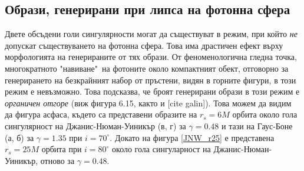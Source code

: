 \subsection{Образи, генерирани при липса на фотонна сфера}

Двете обсъдени голи сингулярности могат да съществуват в режим, при който \emph{не} допускат съществуването на фотонна сфера. Това има драстичен ефект върху морфологията на генерираните от тях образи. От феноменологична гледна точка, многократното "навиване"$\,$ на фотоните около компактният обект, отговорно за генерирането на безкрайният набор от пръстени, видян в горните фигури, в този режим е невъзможно. Това подсказва, че броят генерирани образи в този режим е \emph{органичен отгоре} (виж фигура 6.15, както и [cite galin]). Това можем да видим да фигура асфаса, където са представени образите на $r_s = 6M$ орбита около гола сингулярност на Джанис-Нюман-Уиникър (в, г) за $\gamma = 0.48$ и тази на Гаус-Боне (а, б) за $\gamma = 1.35$ при $i = 70^\circ$. Докато на фигура \ref{JNW_r25} е представена $r_s = 25M$ орбита при $i = 80^\circ$ около гола сингуларност на Джанис-Нюман-Уиникър, отново за $\gamma = 0.48$. \newpage

